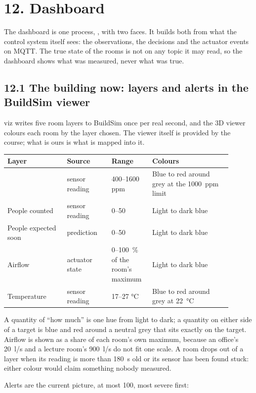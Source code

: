 \section{12. Dashboard}

The dashboard is one process, , with two faces. It builds both from
what the control system itself sees: the observations, the decisions and the
actuator events on MQTT. The true state of the rooms is not on any topic it may
read, so the dashboard shows what was measured, never what was true.

\subsection{12.1 The building now: layers and alerts in the BuildSim viewer}

viz writes five room layers to BuildSim once per real second, and the 3D viewer
colours each room by the layer chosen. The viewer itself is provided by the
course; what is ours is what is mapped into it.

\begin{longtable}[]{@{}L{0.24\linewidth}L{0.18\linewidth}L{0.16\linewidth}L{0.32\linewidth}@{}}
\toprule
\textbf{Layer} & \textbf{Source} & \textbf{Range} & \textbf{Colours} \\
\midrule
\endhead
\COtwo{} & sensor reading & 400--1600 ppm & Blue to red around grey at the 1000~ppm limit \\
People counted & sensor reading & 0--50 & Light to dark blue \\
People expected soon & prediction & 0--50 & Light to dark blue \\
Airflow & actuator state & 0--100~\% of the room's maximum & Light to dark blue \\
Temperature & sensor reading & 17--27 °C & Blue to red around grey at 22~°C \\
\bottomrule
\end{longtable}

A quantity of ``how much'' is one hue from light to dark; a quantity on either
side of a target is blue and red around a neutral grey that sits exactly on the
target. Airflow is shown as a share of each room's own maximum, because an
office's 20~l/s and a lecture room's 900~l/s do not fit one scale. A room drops
out of a layer when its reading is more than 180~s old or its sensor has been
found stuck: either colour would claim something nobody measured.

Alerts are the current picture, at most 100, most severe first:

